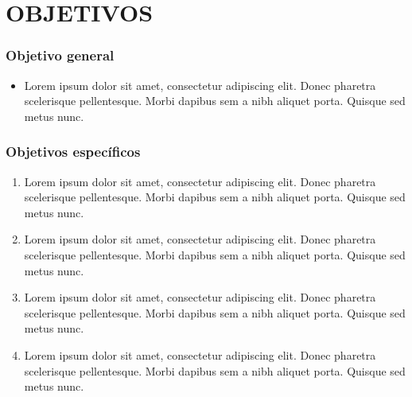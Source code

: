 
\chapter{OBJETIVOS}

\subsection*{Objetivo general}

\begin{itemize}
   \item Lorem ipsum dolor sit amet, consectetur adipiscing elit. Donec pharetra scelerisque pellentesque. Morbi dapibus sem a nibh aliquet porta. Quisque sed metus nunc. 
\end{itemize}

\subsection*{Objetivos específicos}


\begin{enumerate}

    \item Lorem ipsum dolor sit amet, consectetur adipiscing elit. Donec pharetra scelerisque pellentesque. Morbi dapibus sem a nibh aliquet porta. Quisque sed metus nunc. 

    \item Lorem ipsum dolor sit amet, consectetur adipiscing elit. Donec pharetra scelerisque pellentesque. Morbi dapibus sem a nibh aliquet porta. Quisque sed metus nunc. 
    
    \item Lorem ipsum dolor sit amet, consectetur adipiscing elit. Donec pharetra scelerisque pellentesque. Morbi dapibus sem a nibh aliquet porta. Quisque sed metus nunc. 
    
    \item Lorem ipsum dolor sit amet, consectetur adipiscing elit. Donec pharetra scelerisque pellentesque. Morbi dapibus sem a nibh aliquet porta. Quisque sed metus nunc. 

\end{enumerate}
\pagebreak


